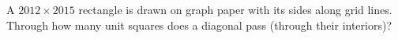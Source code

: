 A $2012\times2015$ rectangle is drawn on graph paper with its sides along grid lines. Through how many unit squares does a diagonal pass (through their interiors)?
